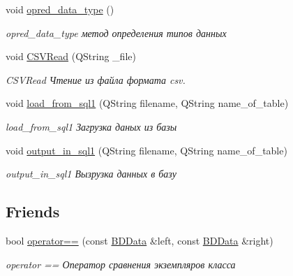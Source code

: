 \begin{DoxyCompactItemize}
\item 
void \hyperlink{classBDData_a1eaee0c86bcdc4b1602b4070468b4dff}{opred\+\_\+data\+\_\+type} ()\hypertarget{classBDData_a1eaee0c86bcdc4b1602b4070468b4dff}{}\label{classBDData_a1eaee0c86bcdc4b1602b4070468b4dff}

\begin{DoxyCompactList}\small\item\em opred\+\_\+data\+\_\+type метод определения типов данных \end{DoxyCompactList}\item 
void \hyperlink{classBDData_addcc825d388c6c8e7056673d70fd89df}{C\+S\+V\+Read} (Q\+String \+\_\+file)
\begin{DoxyCompactList}\small\item\em C\+S\+V\+Read Чтение из файла формата csv. \end{DoxyCompactList}\item 
void \hyperlink{classBDData_a3e181da472256054a23f758b7ba35c4e}{load\+\_\+from\+\_\+sql1} (Q\+String filename, Q\+String name\+\_\+of\+\_\+table)
\begin{DoxyCompactList}\small\item\em load\+\_\+from\+\_\+sql1 Загрузка даных из базы \end{DoxyCompactList}\item 
void \hyperlink{classBDData_a42e5f9017023d4944058efd6ccf39504}{output\+\_\+in\+\_\+sql1} (Q\+String filename, Q\+String name\+\_\+of\+\_\+table)
\begin{DoxyCompactList}\small\item\em output\+\_\+in\+\_\+sql1 Вызрузка данных в базу \end{DoxyCompactList}\end{DoxyCompactItemize}
\subsection*{Friends}
\begin{DoxyCompactItemize}
\item 
bool \hyperlink{classBDData_acf924a02484a8c07e5529d3886776436}{operator==} (const \hyperlink{classBDData}{B\+D\+Data} \&left, const \hyperlink{classBDData}{B\+D\+Data} \&right)
\begin{DoxyCompactList}\small\item\em operator == Оператор сравнения экземпляров класса \end{DoxyCompactList}\end{DoxyCompactItemize}


